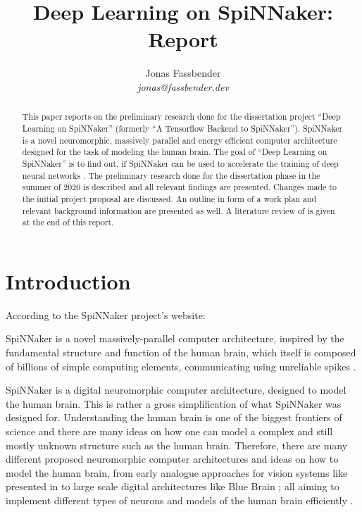\documentclass{article}
\begin{document}

\title{Deep Learning on SpiNNaker: Report}
\author{Jonas Fassbender \\ \textit{jonas@fassbender.dev}}
\date{}

\makeEPCCtitle

\newpage

\hspace{0pt}
\vfill

\begin{abstract}
This paper reports on the preliminary research done for the
dissertation project ``Deep Learning on SpiNNaker''
(formerly ``A Tensorflow Backend to SpiNNaker'').
SpiNNaker is a novel neuromorphic, massively parallel and
energy efficient computer architecture designed for the
task of modeling the human brain.
The goal of ``Deep Learning on SpiNNaker'' is to find out,
if SpiNNaker can be used to accelerate the training of
deep neural networks \citep[see e.g.][]{goodfellow2016}.
The preliminary research done for the dissertation phase
in the summer of 2020 is described and all relevant
findings are presented.
Changes made to the initial project proposal are discussed.
An outline in form of a work plan and relevant background
information are presented as well.
A literature review of \citet{nita_2018} is given at the
end of this report.
\end{abstract}

\vfill
\hspace{0pt}

\newpage

\tableofcontents

\newpage


\section{Introduction} %
\label{sec:intro}

According to the SpiNNaker project's website:
\begin{displayquote}
  SpiNNaker is a novel massively-parallel computer
  architecture, inspired by the fundamental structure and
  function of the human brain, which itself is composed of
  billions of simple computing elements, communicating
  using unreliable spikes \citep{spinn_proj}.
\end{displayquote}

SpiNNaker is a digital neuromorphic computer architecture,
designed to model the human brain.
This is rather a gross simplification of what SpiNNaker was
designed for.
Understanding the human brain is one of the biggest
frontiers of science and there are many ideas on how one
can model a complex and still mostly unknown structure such
as the human brain.
Therefore, there are many different proposed neuromorphic
computer architectures and ideas on how to model the human
brain, from early analogue approaches for vision systems
like presented in \citet{mead1989} to large scale digital
architectures like Blue Brain \citep{markram2006}; all
aiming to implement different types of neurons and models
of the human brain efficiently \citep{furber_et_al_2007}.
\end{document}
